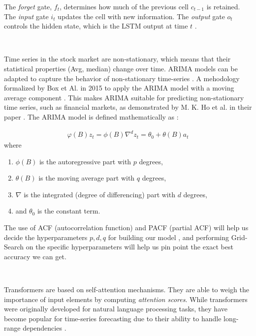 \documentclass[12pt, letterpaper]{article}
\begin{document}
The \textit{forget} gate, $f_t$, determines how much of the previous cell $c_{t-1}$ is retained. The \textit{input} gate $i_t$ updates the cell with new information. The \textit{output} gate $o_t$ controls the hidden state, which is the LSTM output at time $t$ \cite{hochreiter1997}.


    \
    
    Time series in the stock market are non-stationary, which means that their statistical properties (Avg, median) change over time. ARIMA models can be adapted to capture the behavior of non-stationary time-series \cite{ho2021}. A mehodology formalized by Box et Al. in 2015 to apply the ARIMA model with a moving average component \cite{box2015}.
    This makes ARIMA suitable for predicting non-stationary time series, such as financial markets, as demonstrated by M. K. Ho et al. in their paper \cite{ho2021}.
    The ARIMA model is defined mathematically as \cite{box2015}:
    {\small
    \begin{align*}
        \varphi (B) z_t = \phi (B)\nabla^d z_t = \theta_0 + \theta (B)a_t
    \end{align*}
    where
    \begin{enumerate}[label=-]
        \item $\phi(B)$ is the autoregressive part with $p$ degrees,
        \item $\theta (B)$ is the moving average part with $q$ degrees,
        \item $\nabla$ is the integrated (degree of differencing) part with $d$ degrees,
        \item and $\theta_0$ is the constant term.
    \end{enumerate}
    }

    The use of ACF (autocorrelation function) and PACF (partial ACF) will help us decide the hyperparameters $p, d, q$ for building our model \cite{hyndman2018}, and performing Grid-Search on the specific hyperparameters will help us pin point the exact best accuracy we can get.
    
    \

    Transformers are based on self-attention mechanisms. They are able to weigh the importance of input elements by computing \textit{attention scores}.
    While transformers were originally developed for natural language processing tasks, they have become popular for time-series forecasting due to their ability to handle long-range dependencies \cite{vaswani2017attention}.
\end{document}
